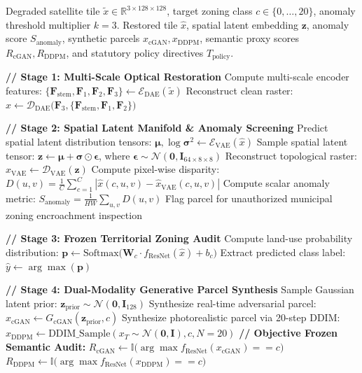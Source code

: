 \documentclass[journal]{IEEEtran}
\begin{document}
\begin{algorithm}[!t]
\caption{UrbanGen AI Multi-Stage Cooperative Execution and Semantic Auditing Pipeline}
\label{alg:urbangen}
\begin{algorithmic}[1]
\REQUIRE Degraded satellite tile $\tilde{x} \in \mathbb{R}^{3 \times 128 \times 128}$, target zoning class $c \in \{0, \dots, 20\}$, anomaly threshold multiplier $k=3$.
\ENSURE Restored tile $\hat{x}$, spatial latent embedding $\mathbf{z}$, anomaly score $S_{\text{anomaly}}$, synthetic parcels $x_{\text{cGAN}}, x_{\text{DDPM}}$, semantic proxy scores $R_{\text{cGAN}}, R_{\text{DDPM}}$, and statutory policy directives $T_{\text{policy}}$.

\STATE \textbf{// Stage 1: Multi-Scale Optical Restoration}
\STATE Compute multi-scale encoder features: $\{\mathbf{F}_{\text{stem}}, \mathbf{F}_1, \mathbf{F}_2, \mathbf{F}_3\} \leftarrow \mathcal{E}_{\text{DAE}}(\tilde{x})$
\STATE Reconstruct clean raster: $\hat{x} \leftarrow \mathcal{D}_{\text{DAE}}\big(\mathbf{F}_3, \{\mathbf{F}_{\text{stem}}, \mathbf{F}_1, \mathbf{F}_2\}\big)$

\STATE \textbf{// Stage 2: Spatial Latent Manifold \& Anomaly Screening}
\STATE Predict spatial latent distribution tensors: $\bm{\mu}, \log \bm{\sigma}^2 \leftarrow \mathcal{E}_{\text{VAE}}(\hat{x})$
\STATE Sample spatial latent tensor: $\mathbf{z} \leftarrow \bm{\mu} + \bm{\sigma} \odot \bm{\epsilon}$, where $\bm{\epsilon} \sim \mathcal{N}(\mathbf{0}, \mathbf{I}_{64 \times 8 \times 8})$
\STATE Reconstruct topological raster: $\hat{x}_{\text{VAE}} \leftarrow \mathcal{D}_{\text{VAE}}(\mathbf{z})$
\STATE Compute pixel-wise disparity: $D(u, v) = \frac{1}{C}\sum_{c=1}^C |\hat{x}(c, u, v) - \hat{x}_{\text{VAE}}(c, u, v)|$
\STATE Compute scalar anomaly metric: $S_{\text{anomaly}} = \frac{1}{HW}\sum_{u, v} D(u, v)$
    \STATE Flag parcel for unauthorized municipal zoning encroachment inspection
\ENDIF

\STATE \textbf{// Stage 3: Frozen Territorial Zoning Audit}
\STATE Compute land-use probability distribution: $\mathbf{p} \leftarrow \text{Softmax}\big(\mathbf{W}_c \cdot f_{\text{ResNet}}(\hat{x}) + b_c\big)$
\STATE Extract predicted class label: $\hat{y} \leftarrow \arg\max(\mathbf{p})$

\STATE \textbf{// Stage 4: Dual-Modality Generative Parcel Synthesis}
\STATE Sample Gaussian latent prior: $\mathbf{z}_{\text{prior}} \sim \mathcal{N}(\mathbf{0}, \mathbf{I}_{128})$
\STATE Synthesize real-time adversarial parcel: $x_{\text{cGAN}} \leftarrow G_{\text{cGAN}}(\mathbf{z}_{\text{prior}}, c)$
\STATE Synthesize photorealistic parcel via 20-step DDIM: $x_{\text{DDPM}} \leftarrow \text{DDIM\_Sample}(x_T \sim \mathcal{N}(\mathbf{0}, \mathbf{I}), c, N=20)$
\STATE \textbf{// Objective Frozen Semantic Audit:}
\STATE $R_{\text{cGAN}} \leftarrow \mathbb{I}\big(\arg\max f_{\text{ResNet}}(x_{\text{cGAN}}) == c\big)$
\STATE $R_{\text{DDPM}} \leftarrow \mathbb{I}\big(\arg\max f_{\text{ResNet}}(x_{\text{DDPM}}) == c\big)$


\end{algorithmic}
\end{algorithm}
\end{document}
